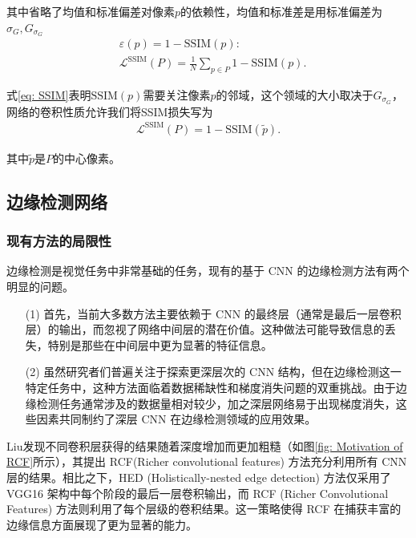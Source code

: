 \documentclass[a4paper]{ctexart}
\begin{document}
	其中省略了均值和标准偏差对像素$p$的依赖性，均值和标准差是用标准偏差为$\sigma_G,G_{\sigma_G}$
	\begin{equation}
		\begin{aligned}
			&\varepsilon(p)=1-\text{SSIM}(p): \\  &\mathcal{L}^{\text{SSIM}}(P)=\frac{1}{N}\sum_{p \in P}1-\text{SSIM}(p).
		\end{aligned}
		\label{eq: SSIM loss}
	\end{equation}
	
	式\ref{eq: SSIM}表明$\text{SSIM}(p)$需要关注像素$p$的邻域，这个领域的大小取决于$G_{\sigma_G}$，网络的卷积性质允许我们将SSIM损失写为
	\begin{equation}
		\begin{aligned}
			\mathcal{L}^{\text{SSIM}}(P)=1-\text{SSIM}(\tilde{p}).
		\end{aligned}
		\label{eq: revised_SSIM loss}
	\end{equation}
	
	其中$\tilde{p}$是$P$的中心像素。
	
	\subsection{边缘检测网络}
	
	\subsubsection{现有方法的局限性}
	
	边缘检测是视觉任务中非常基础的任务，现有的基于 CNN 的边缘检测方法有两个明显的问题。
	
	\begin{itemize}
		\item [(1)] 首先，当前大多数方法主要依赖于 CNN 的最终层（通常是最后一层卷积层）的输出，而忽视了网络中间层的潜在价值。这种做法可能导致信息的丢失，特别是那些在中间层中更为显著的特征信息。
		
		\item [(2)] 虽然研究者们普遍关注于探索更深层次的 CNN 结构，但在边缘检测这一特定任务中，这种方法面临着数据稀缺性和梯度消失问题的双重挑战。由于边缘检测任务通常涉及的数据量相对较少，加之深层网络易于出现梯度消失，这些因素共同制约了深层 CNN 在边缘检测领域的应用效果。
	\end{itemize}

	Liu\cite{liu2017richer}发现不同卷积层获得的结果随着深度增加而更加粗糙（如图\ref{fig: Motivation of RCF}所示），其提出 RCF(Richer convolutional features) 方法充分利用所有 CNN 层的结果。相比之下，HED (Holistically-nested edge detection) \cite{xie2015holistically}方法仅采用了 VGG16 架构中每个阶段的最后一层卷积输出，而 RCF (Richer Convolutional Features) 方法则利用了每个层级的卷积结果。这一策略使得 RCF 在捕获丰富的边缘信息方面展现了更为显著的能力。
\end{document}
